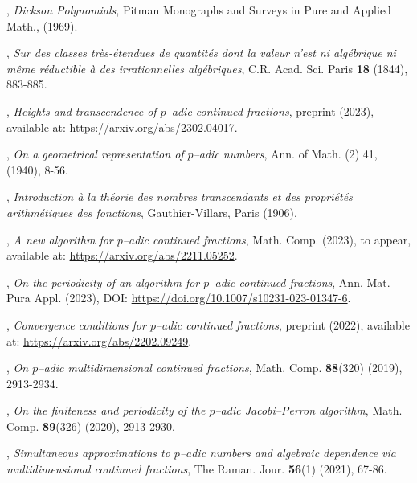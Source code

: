 \documentclass[12pt, reqno]{amsart}
\theoremstyle{plain}
\theoremstyle{definition}
\begin{document}
\begin{thebibliography}{}
,
\textit{Dickson Polynomials},
\newblock Pitman Monographs and Surveys in Pure and Applied Math., (1969).

,
\textit{Sur des classes très-étendues de quantités dont la valeur n'est ni algébrique ni même réductible à des irrationnelles algébriques},
\newblock C.R. Acad. Sci. Paris \textbf{18} (1844), 883-885.

,
\textit{Heights and transcendence of $p$--adic continued fractions},
\newblock preprint (2023), available at: \href{https://arxiv.org/abs/2302.04017}{https://arxiv.org/abs/2302.04017}.

,
\textit{On a geometrical representation of $p$--adic numbers},
\newblock Ann. of Math. (2) 41, (1940), 8-56.

, 
\textit{Introduction à la théorie des nombres transcendants et des propriétés arithmétiques des fonctions}, 
\newblock Gauthier-Villars, Paris (1906).

,
\textit{A new algorithm for $p$--adic continued fractions},
\newblock Math. Comp. (2023), to appear, available at: \href{https://arxiv.org/abs/2211.05252}{https://arxiv.org/abs/2211.05252}.

,
\textit{On the periodicity of an algorithm for $p$--adic continued fractions},
\newblock Ann. Mat. Pura Appl. (2023), DOI: \href{https://doi.org/10.1007/s10231-023-01347-6}{https://doi.org/10.1007/s10231-023-01347-6}.

,
\textit{Convergence conditions for $p$--adic continued fractions},
\newblock preprint (2022), available at: \href{https://arxiv.org/abs/2202.09249}{https://arxiv.org/abs/2202.09249}.

,
\textit{On $p$--adic multidimensional continued fractions},
\newblock Math. Comp. \textbf{88}(320) (2019), 2913-2934.

,
\textit{On the finiteness and periodicity of the $p$--adic Jacobi–Perron algorithm},
\newblock Math. Comp. \textbf{89}(326) (2020), 2913-2930.

,
\textit{Simultaneous approximations to $p$--adic numbers and algebraic dependence via multidimensional continued fractions},
\newblock The Raman. Jour. \textbf{56}(1) (2021), 67-86.


\end{thebibliography}
\end{document}
